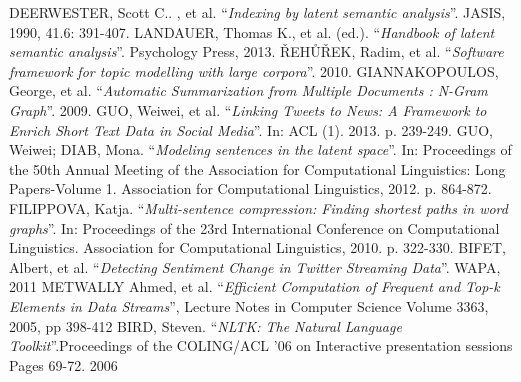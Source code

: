 \documentclass{acm_proc_article-sp-sigmod07}
\begin{document}
\begin{thebibliography}{9}
	DEERWESTER, Scott C.. , et al. ``\emph{Indexing by latent semantic analysis}''. JASIS, 1990, 41.6: 391-407.
	LANDAUER, Thomas K., et al. (ed.). ``\emph{Handbook of latent semantic analysis}''. Psychology Press, 2013.
	ŘEHŮŘEK, Radim, et al. ``\emph{Software framework for topic modelling with large corpora}''. 2010.
	GIANNAKOPOULOS, George, et al. ``\emph{Automatic Summarization from Multiple Documents : N-Gram Graph}''. 2009.
	GUO, Weiwei, et al. ``\emph{Linking Tweets to News: A Framework to Enrich Short Text Data in Social Media}''. In: ACL (1). 2013. p. 239-249.
	GUO, Weiwei; DIAB, Mona. ``\emph{Modeling sentences in the latent space}''. In: Proceedings of the 50th Annual Meeting of the Association for Computational Linguistics: Long Papers-Volume 1. Association for Computational Linguistics, 2012. p. 864-872.
	FILIPPOVA, Katja. ``\emph{Multi-sentence compression: Finding shortest paths in word graphs}''. In: Proceedings of the 23rd International Conference on Computational Linguistics. Association for Computational Linguistics, 2010. p. 322-330.
	BIFET, Albert, et al. ``\emph{Detecting Sentiment Change in Twitter Streaming Data}''. WAPA, 2011
	METWALLY Ahmed, et al. ``\emph{Efficient Computation of Frequent and Top-k
	Elements in Data Streams}'', Lecture Notes in Computer Science Volume 3363, 2005, pp 398-412
	BIRD, Steven. ``\emph{NLTK: The Natural Language Toolkit}''.Proceedings of the COLING/ACL '06 on Interactive presentation sessions
Pages 69-72. 2006

\end{thebibliography}
\end{document}
